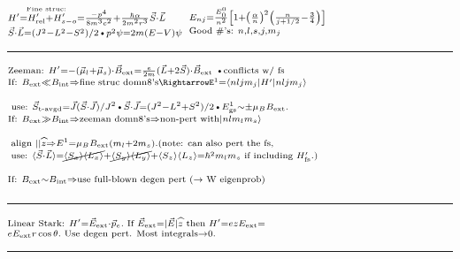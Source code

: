 \documentclass{article}
\newcommand{\YgorUD}[2]{\,\!^{#1}_{#2}}
\begin{document}
\begin{multicols}{2}
$\YgorUD{%
        \smash{\overset{\text{Fine struc:}}{%
        H'  = H'_{ \text{rel}}  +  H'_{ s - o}   =}}%
        \frac{-p^{4}}{8m^{ 3} c^{ 2}} +%
        \frac{\hbar \alpha}{2m^{ 2} r^{3}} \vec{S}\cdot \vec{L}%
    }{%
        \vec{S}\cdot \vec{L} = ( J^{2} - L^{2} - S^{2} ) / 2%
        \text{\textbullet}%
        p^{2}\psi = 2m( E - V )\psi%
    }    $\hfill\textbullet\hfill%
    $\YgorUD{%
        E_{nj} = \frac{E^{0}_{0}}{n^{2}} %
        \left[ 1  +  \left(  \frac{\alpha}{n}  \right)^{  2}%
         \left(  \frac{n}{j + 1  / 2} -  \frac{3}{4}  \right) \right]%
    }{%
        \text{Good \#'s: } n, l, s, j, m_{j}%
    }$
\hrule

$\YgorUD{%
        \text{Zeeman: }%
        H'  = -( \vec{\mu}_{l}  +  \vec{\mu}_{s} )\cdot \vec{B}_{\text{ext}}%
         = \frac{e}{2m} ( \vec{L} + 2\vec{S} )\cdot \vec{B}_{\text{ext}}%
        \text{ \textbullet conflicts w/ fs}
    }{%
        \text{If: }B_{\text{ext}} \ll B_{\text{int}} \Rightarrow %
        \text{fine struc domn8's} \Rightarrow%
        E^{1} = \braket{ nljm_{j} | H' | nljm_{ j} }%
    }$%


$\YgorUD{%
        \text{ use: }\vec{S}_{\text{t-avgd}} = \vec{J} ( \vec{S}\cdot \vec{J} ) / J^{2}%
        \text{\textbullet}%
        \vec{S}\cdot \vec{J} = ( J^{2} - L^{2} + S^{2} ) / 2%
        \text{\textbullet} E^{1}_{\text{gs}} \sim \pm \mu_{B} B_{\text{ext}}.%
    }{%
        \text{If: }B_{\text{ext}} \gg B_{\text{int}} \Rightarrow %
        \text{zeeman domn8's} \Rightarrow%
        \text{non-pert with} \ket{ nlm_{ l}m_{ s} }%
    }$%

$\YgorUD{%
        \text{ align } ||\widehat{z} \Rightarrow %
        E^{1} = \mu_{ B}B_{\text{ext}} ( m_{ l} + 2m_{ s} ).%
        \text{(note: can also pert the fs,}%
    }{%
        \text{ use: }\braket{ \vec{S}\cdot \vec{L} } = %
        \cancel{\braket{ S_{ x} } \braket{ L_{ x} }}  + %
        \cancel{\braket{ S_{ y} } \braket{ L_{ y} }}  + %
        \braket{ S_{ z} } \braket{ L_{ z} }  = %
        \hbar^{2}m_{ l}m_{ s}%
        \text{ if including }H'_{\text{fs}}. )%
    }$

$\YgorUD{%
        \text{If: }B_{\text{ext}} \sim B_{\text{int}} \Rightarrow %
        \text{use full-blown degen pert ($\rightarrow$ W eigenprob)}%
    }{%
        \,%
    }$
\hrule

$\YgorUD{%
        \text{Linear Stark: }%
        H'  = \vec{E}_{\text{ext}}\cdot\vec{p}_{ e}.%
        \text{ If } \vec{E}_{\text{ext}} = | \vec{E} |\widehat{z}%
        \text{ then } H'  = ezE_{\text{ext}}  = %
    }{%
        eE_{\text{ext}} r\cos\theta. \text{ Use degen pert. Most integrals}%
        \rightarrow 0.
    }$%
\hrule


\end{multicols}
\end{document}

